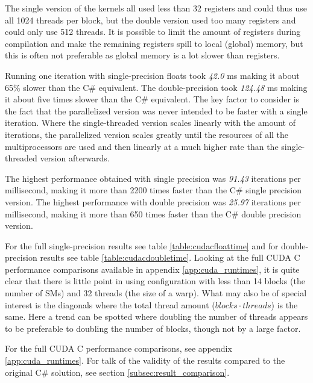 The single version of the kernels all used less than 32 registers and could thus use all 1024 threads per block, but the double version used too many registers and could only use 512 threads. 
It is possible to limit the amount of registers during compilation and make the remaining registers spill to local (global) memory, but this is often not preferable as global memory is a lot slower than registers.

Running one iteration with single-precision floats took \emph{42.0} ms making it about 65\% slower than the C\# equivalent.
The double-precision took \emph{124.48} ms making it about five times slower than the C\# equivalent.
The key factor to consider is the fact that the parallelized version was never intended to be faster with a single iteration.
Where the single-threaded version scales linearly with the amount of iterations, the parallelized version scales greatly until the resources of all the multiprocessors are used and then linearly at a much higher rate than the single-threaded version afterwards.

The highest performance obtained with single precision was \emph{91.43} iterations per millisecond, making it more than 2200 times faster than the C\# single precision version.
The highest performance with double precision was \emph{25.97} iterations per millisecond, making it more than 650 times faster than the C\# double precision version.

For the full single-precision results see table \ref{table:cudacfloattime} and for double-precision results see table \ref{table:cudacdoubletime}.
Looking at the full CUDA C performance comparisons available in appendix \ref{app:cuda_runtimes}, it is quite clear that there is little point in using configuration with less than 14 blocks (the number of SMs) and 32 threads (the size of a warp).
What may also be of special interest is the diagonals where the total thread amount ($blocks \cdot threads$) is the same.
Here a trend can be spotted where doubling the number of threads appears to be preferable to doubling the number of blocks, though not by a large factor.

For the full CUDA C performance comparisons, see appendix \ref{app:cuda_runtimes}.
For talk of the validity of the results compared to the original C\# solution, see section \ref{subsec:result_comparison}.

